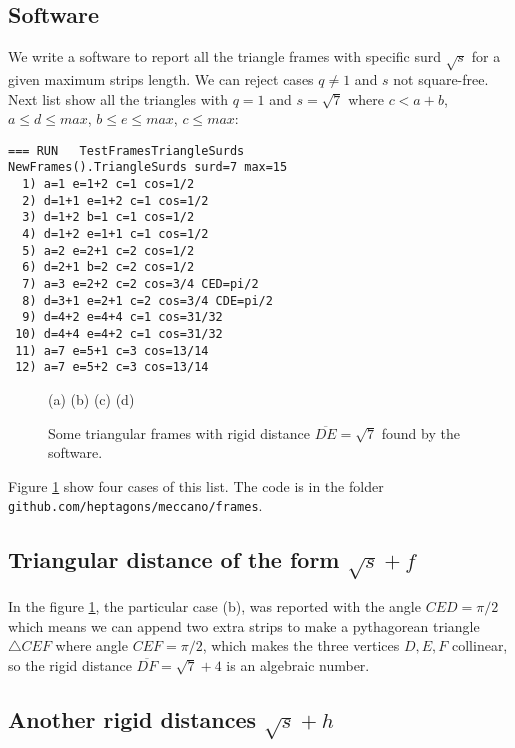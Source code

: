 \documentclass[11pt]{article}
\begin{document}
\subsection{Software}

We write a software to report all the triangle frames with specific surd $\sqrt{s}$
for a given maximum strips length.
We can reject cases $q \neq 1$ and $s$ not square-free.
Next list show all the triangles with $q=1$ and $s=\sqrt{7}$ where
$c < a+b$, $a\leq d\leq max$, $b\leq e\leq max$, $c\leq max$:
\begin{lstlisting}
=== RUN   TestFramesTriangleSurds
NewFrames().TriangleSurds surd=7 max=15
  1) a=1 e=1+2 c=1 cos=1/2
  2) d=1+1 e=1+2 c=1 cos=1/2
  3) d=1+2 b=1 c=1 cos=1/2
  4) d=1+2 e=1+1 c=1 cos=1/2
  5) a=2 e=2+1 c=2 cos=1/2
  6) d=2+1 b=2 c=2 cos=1/2
  7) a=3 e=2+2 c=2 cos=3/4 CED=pi/2
  8) d=3+1 e=2+1 c=2 cos=3/4 CDE=pi/2
  9) d=4+2 e=4+4 c=1 cos=31/32
 10) d=4+4 e=4+2 c=1 cos=31/32
 11) a=7 e=5+1 c=3 cos=13/14
 12) a=7 e=5+2 c=3 cos=13/14
\end{lstlisting}

\begin{figure}[h]
\centering
\begin{center}
(a)
(b)
(c)
(d)
\end{center}
\caption{Some triangular frames with rigid distance $\overline{DE}=\sqrt{7}$ found by the software.
}
\label{fig:surd7}
\end{figure}

Figure \ref{fig:surd7} show four cases of this list.
The code is in the folder \texttt{github.com/heptagons/meccano/frames}.

\subsection{Triangular distance of the form $\sqrt{s} + f$}

In the figure \ref{fig:surd7}, the particular case (b),
was reported with the angle $CED=\pi/2$ which means we can append two extra strips to make
a pythagorean triangle $\triangle{CEF}$ where angle ${CEF}=\pi/2$, which makes
the three vertices $D,E,F$ collinear, so the rigid distance $\overline{DF}=\sqrt{7}+4$ is an algebraic number.


\subsection{Another rigid distances $\sqrt{s} + h$}
\end{document}
